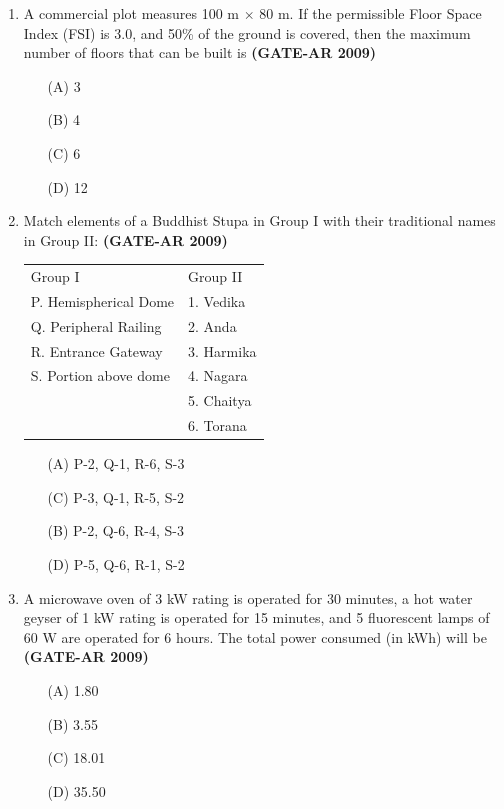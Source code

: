 \documentclass[a4paper,10pt]{article}
\begin{document}
\begin{enumerate}
    \item A commercial plot measures 100 m $\times$ 80 m. If the permissible Floor Space Index (FSI) is 3.0, and 50\% of the ground is covered, then the maximum number of floors that can be built is \hfill \textbf{(GATE-AR 2009)}
    \begin{multicols}{4}
	\begin{itemize}
        \item[(A)] 3
        \item[(B)] 4
        \item[(C)] 6
        \item[(D)] 12
    \end{itemize}
	\end{multicols}

    \item Match elements of a Buddhist Stupa in Group I with their traditional names in Group II: \hfill \textbf{(GATE-AR 2009)} \\
	\begin{tabular}{ p p }
	Group I & Group II \\
	P. Hemispherical Dome & 1. Vedika \\
	Q. Peripheral Railing & 2. Anda \\
	R. Entrance Gateway & 3. Harmika \\
	S. Portion above dome & 4. Nagara \\
	& 5. Chaitya \\
	& 6. Torana \\
	\end{tabular}
	\begin{multicols}{2}
	\begin{itemize}
        \item[(A)] P-2, Q-1, R-6, S-3
        \item[(C)] P-3, Q-1, R-5, S-2
        \item[(B)] P-2, Q-6, R-4, S-3
        \item[(D)] P-5, Q-6, R-1, S-2
    \end{itemize}
	\end{multicols}

    \item A microwave oven of 3 kW rating is operated for 30 minutes, a hot water geyser of 1 kW rating is operated for 15 minutes, and 5 fluorescent lamps of 60 W are operated for 6 hours. The total power consumed (in kWh) will be \hfill \textbf{(GATE-AR 2009)}
    \begin{multicols}{4}
	\begin{itemize}
        \item[(A)] 1.80
        \item[(B)] 3.55
        \item[(C)] 18.01
        \item[(D)] 35.50
    \end{itemize}
	\end{multicols}


\end{enumerate}
\end{document}
